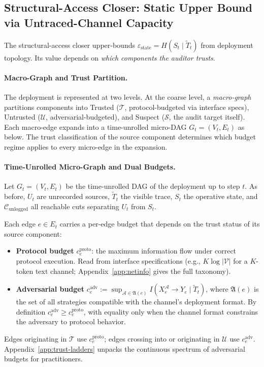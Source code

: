 \documentclass{article}
\begin{document}
\subsection{Structural-Access Closer: Static Upper Bound via Untraced-Channel Capacity}
\label{sec:static-cert}

The structural-access closer upper-bounds $\varepsilon_\text{state} = H(S_t \mid \tilde T_t)$ from deployment topology. Its value depends on \emph{which components the auditor trusts}.

\paragraph{Macro-Graph and Trust Partition.}

The deployment is represented at two levels. At the coarse level, a \emph{macro-graph} partitions components into Trusted ($\mathcal{T}$, protocol-budgeted via interface specs), Untrusted ($\mathcal{U}$, adversarial-budgeted), and Suspect ($\mathcal{S}$, the audit target itself).
Each macro-edge expands into a time-unrolled micro-DAG $G_t = (V_t, E_t)$ as below. The trust classification of the source component determines which budget regime applies to every micro-edge in the expansion.

\paragraph{Time-Unrolled Micro-Graph and Dual Budgets.}

Let $G_t = (V_t, E_t)$ be the time-unrolled DAG of the deployment up to step $t$. As before, $U_t$ are unrecorded sources, $\tilde T_t$ the visible trace, $S_t$ the operative state, and $\mathcal{C}_\text{unlogged}$ all reachable cuts separating $U_t$ from $S_t$.

Each edge $e \in E_t$ carries a per-edge budget that depends on the trust status of its source component:
\begin{itemize}
  \item \textbf{Protocol budget} $c_e^{\text{proto}}$: the maximum information flow under correct protocol execution. Read from interface specifications (e.g., $K \log |\mathcal{V}|$ for a $K$-token text channel; Appendix~\ref{app:netinfo} gives the full taxonomy).
  \item \textbf{Adversarial budget} $c_e^{\text{adv}} := \sup_{\mathcal{A} \in \mathfrak{A}(e)} I(X_e^{\mathcal{A}} \to Y_e \mid \tilde T_t)$, where $\mathfrak{A}(e)$ is the set of all strategies compatible with the channel's deployment format. By definition $c_e^{\text{adv}} \geq c_e^{\text{proto}}$, with equality only when the channel format constrains the adversary to protocol behavior.
\end{itemize}
Edges originating in $\mathcal{T}$ use $c_e^{\text{proto}}$; edges crossing into or originating in $\mathcal{U}$ use $c_e^{\text{adv}}$. Appendix~\ref{app:trust-ladders} unpacks the continuous spectrum of adversarial budgets for practitioners.
\end{document}
